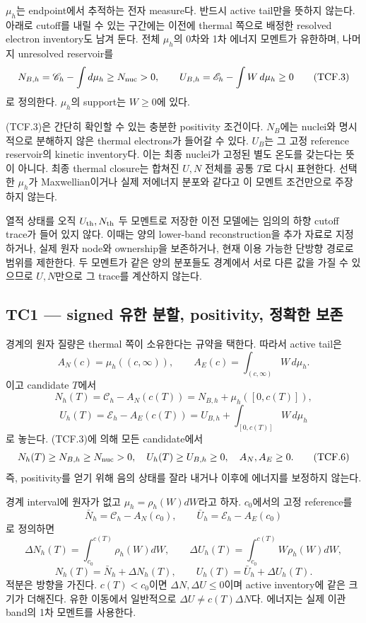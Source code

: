 \(\mu_h\)는 endpoint에서 추적하는 전자 measure다. 반드시 active tail만을 뜻하지 않는다. 아래로 cutoff를 내릴 수 있는 구간에는 이전에 thermal 쪽으로 배정한 resolved electron inventory도 남겨 둔다. 전체 \(\mu_h\)의 0차와 1차 에너지 모멘트가 유한하며, 나머지 unresolved reservoir를 \[
N_{B,h}=\mathscr C_h-\int d\mu_h\ge N_{\rm nuc}>0,\qquad
U_{B,h}=\mathscr E_h-\int W\,d\mu_h\ge0
\tag{TCF.3}
\] 로 정의한다. \(\mu_h\)의 support는 \(W\ge0\)에 있다.

(TCF.3)은 간단히 확인할 수 있는 충분한 positivity 조건이다. \(N_B\)에는 nuclei와 명시적으로 분해하지 않은 thermal electrons가 들어갈 수 있다. \(U_B\)는 그 고정 reference reservoir의 kinetic inventory다. 이는 최종 nuclei가 고정된 별도 온도를 갖는다는 뜻이 아니다. 최종 thermal closure는 합쳐진 \(U,N\) 전체를 공통 \(T\)로 다시 표현한다. 선택한 \(\mu_h\)가 Maxwellian이거나 실제 저에너지 분포와 같다고 이 모멘트 조건만으로 주장하지 않는다.

열적 상태를 오직 \(U_{\rm th},N_{\rm th}\) 두 모멘트로 저장한 이전 모델에는 임의의 하향 cutoff trace가 들어 있지 않다. 이때는 양의 lower-band reconstruction을 추가 자료로 지정하거나, 실제 원자 node와 ownership을 보존하거나, 현재 이용 가능한 단방향 경로로 범위를 제한한다. 두 모멘트가 같은 양의 분포들도 경계에서 서로 다른 값을 가질 수 있으므로 \(U,N\)만으로 그 trace를 계산하지 않는다.

\hypertarget{tc1-signed-uxc720uxd55c-uxbd84uxd560-positivity-uxc815uxd655uxd55c-uxbcf4uxc874}{%
\subsection{TC1 --- signed 유한 분할, positivity, 정확한 보존}\label{tc1-signed-uxc720uxd55c-uxbd84uxd560-positivity-uxc815uxd655uxd55c-uxbcf4uxc874}}

경계의 원자 질량은 thermal 쪽이 소유한다는 규약을 택한다. 따라서 active tail은 \[
A_N(c)=\mu_h((c,\infty)),\qquad
A_E(c)=\int_{(c,\infty)}W\,d\mu_h .
\tag{TCF.4}
\] 이고 candidate \(T\)에서 \[
N_h(T)=\mathscr C_h-A_N(c(T))
      =N_{B,h}+\mu_h([0,c(T)]),
\] \[
U_h(T)=\mathscr E_h-A_E(c(T))
      =U_{B,h}+\int_{[0,c(T)]}W\,d\mu_h
\tag{TCF.5}
\] 로 놓는다. (TCF.3)에 의해 모든 candidate에서 \[
N_h(T)\ge N_{B,h}\ge N_{\rm nuc}>0,\quad U_h(T)\ge U_{B,h}\ge0,
\quad A_N,A_E\ge0 .
\tag{TCF.6}
\] 즉, positivity를 얻기 위해 음의 상태를 잘라 내거나 이후에 에너지를 보정하지 않는다.

경계 interval에 원자가 없고 \(\mu_h=\rho_h(W)dW\)라고 하자. \(c_0\)에서의 고정 reference를 \[
\bar N_h=\mathscr C_h-A_N(c_0),\qquad
\bar U_h=\mathscr E_h-A_E(c_0)
\tag{TCF.7}
\] 로 정의하면 \[
\Delta N_h(T)=\int_{c_0}^{c(T)}\rho_h(W)dW,\qquad
\Delta U_h(T)=\int_{c_0}^{c(T)}W\rho_h(W)dW,
\tag{TCF.8}
\] \[
N_h(T)=\bar N_h+\Delta N_h(T),\qquad
U_h(T)=\bar U_h+\Delta U_h(T).
\tag{TCF.9}
\] 적분은 방향을 가진다. \(c(T)<c_0\)이면 \(\Delta N,\Delta U\le0\)이며 active inventory에 같은 크기가 더해진다. 유한 이동에서 일반적으로 \(\Delta U\ne c(T)\Delta N\)다. 에너지는 실제 이관 band의 1차 모멘트를 사용한다.

